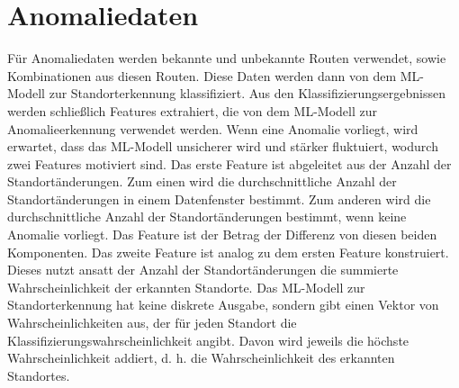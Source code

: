 \section{Anomaliedaten}
\label{sec:data_anomalie}
Für Anomaliedaten werden bekannte und unbekannte Routen verwendet, sowie Kombinationen aus diesen Routen.
Diese Daten werden dann von dem ML-Modell zur Standorterkennung klassifiziert.
Aus den Klassifizierungsergebnissen werden schließlich Features extrahiert, die von dem ML-Modell zur Anomalieerkennung verwendet werden.
\newline
\newline
Wenn eine Anomalie vorliegt, wird erwartet, dass das ML-Modell unsicherer wird und stärker fluktuiert,
wodurch zwei Features motiviert sind.
Das erste Feature ist abgeleitet aus der Anzahl der Standortänderungen.
Zum einen wird die durchschnittliche Anzahl der Standortänderungen in einem Datenfenster bestimmt.
Zum anderen wird die durchschnittliche Anzahl der Standortänderungen bestimmt, wenn keine Anomalie vorliegt.
Das Feature ist der Betrag der Differenz von diesen beiden Komponenten.
\newline
\newline
Das zweite Feature ist analog zu dem ersten Feature konstruiert.
Dieses nutzt ansatt der Anzahl der Standortänderungen die summierte Wahrscheinlichkeit der erkannten Standorte.
Das ML-Modell zur Standorterkennung hat keine diskrete Ausgabe, sondern gibt einen Vektor von Wahrscheinlichkeiten aus,
der für jeden Standort die Klassifizierungswahrscheinlichkeit angibt.
Davon wird jeweils die höchste Wahrscheinlichkeit addiert, d. h. die Wahrscheinlichkeit des erkannten Standortes.